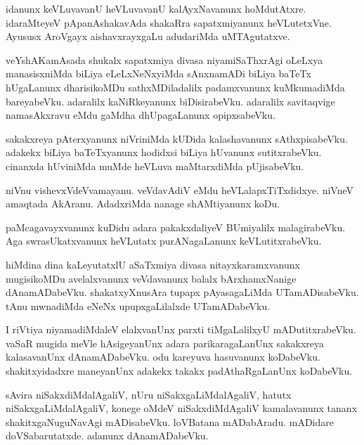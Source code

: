 \documentclass{article}
\begin{document}
\begin{mn}
idanunx  keVLuvavanU  heVLuvavanU  kalAyxNavanunx  hoMdutAtxre.  idaraMteyeV  pApanAshakavAda  
shakaRra sapatxmiyanunx  heVLutetxVne.  Ayususx  AroVgayx  aishavxrayxgaLu  adudariMda  uMTAgutatxve.
\end{mn}

\begin{mn}
veYshAKamAsada  shukalx  sapatxmiya  divasa  niyamiSaThxrAgi  oLeLxya  manasisxniMda  
biLiya  eLeLxNeNxyiMda  sAnxnamADi  biLiya  baTeTx  hUgaLanunx  dharisikoMDu  sathxMDiladalilx  
padamxvanunx  kuMkumadiMda  bareyabeVku.  adaralilx  kaNiRkeyanunx  biDisirabeVku.  adaralilx  
savitaqvige  namasAkxravu  eMdu  gaMdha dhUpagaLanunx  opipxsabeVku.
\end{mn}

\begin{mn}
sakakxreya  pAterxyanunx  niVriniMda  kUDida  kalashavanunx  sAthxpisabeVku.  adakekx  
biLiya  baTeTxyanunx  hodidxsi  biLiya  hUvanunx  sutitxrabeVku.  cinanxda  hUviniMda  
muMde  heVLuva  maMtarxdiMda  pUjisabeVku.
\end{mn}

\begin{mn}
niVnu  vishevxVdeVvamayanu.  veVdavAdiV  eMdu  heVLalapxTiTxdidxye.  niVneV  amaqtada  
AkAranu.  AdadxriMda  nanage  shAMtiyanunx  koDu.
\end{mn}

\begin{mn}
paMcagavayxvanunx  kuDidu  adara  pakakxdaliyeV  BUmiyalilx  malagirabeVku.  Aga  
swrasUkatxvanunx  heVLutatx  purANagaLanunx  keVLutitxrabeVku.
\end{mn}

\begin{mn}
hiMdina  dina  kaLeyutatxlU  aSaTxmiya  divasa  nitayxkaramxvanunx  mugisikoMDu  
avelalxvanunx  veVdavanunx  balalx  bArxhamxNanige  dAnamADabeVku.  shakatxyXnusAra  
tupapx  pAyasagaLiMda  UTamADisabeVku.  tAnu  mwnadiMda  eNeNx  upupxgaLilalxde  UTamADabeVku.
\end{mn}

\begin{mn}
I riVtiya  niyamadiMdaleV  elalxvanUnx  parxti tiMgaLalilxyU  mADutitxrabeVku.  vaSaR  mugida  meVle  
hAsigeyanUnx  adara  parikaragaLanUnx  sakakxreya  kalasavanUnx  dAnamADabeVku.  odu  kareyuva  hasuvanunx  
koDabeVku.  shakitxyidadxre  maneyanUnx  adakekx  takakx  padAthaRgaLanUnx  koDabeVku.
\end{mn}

\begin{mn}
sAvira  niSakxdiMdalAgaliV,  nUru  niSakxgaLiMdalAgaliV,  hatutx  niSakxgaLiMdalAgaliV,  
konege  oMdeV  niSakxdiMdAgaliV  kamalavanunx  tananx  shakitxgaNuguNavAgi  mADisabeVku.  
loVBatana mADabAradu.  mADidare  doVSabarutatxde.  adanunx  dAnamADabeVku.
\end{mn}
\end{document}
